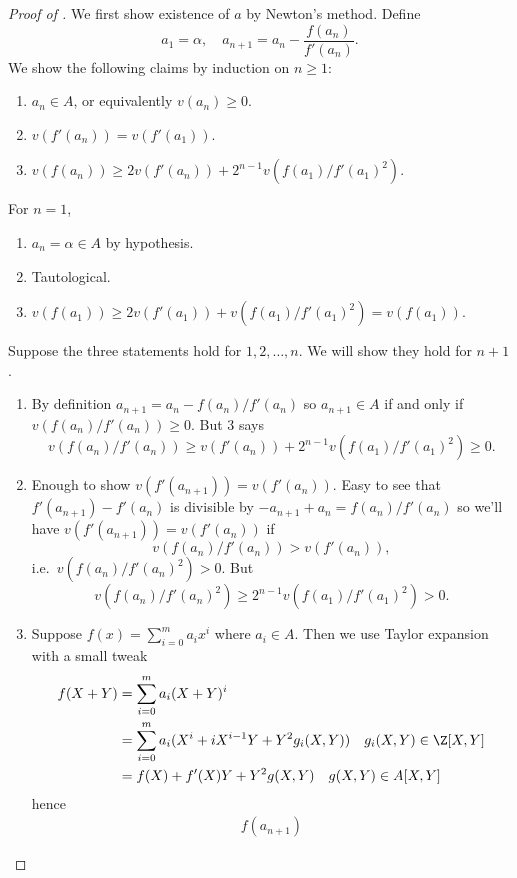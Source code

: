 \documentclass[a4paper]{article}
\begin{document}
\begin{proof}[Proof of ]
  We first show existence of \(a\) by Newton's method. Define
  \[
    a_1 = \alpha, \quad a_{n + 1} = a_n - \frac{f(a_n)}{f'(a_n)}.
  \]
  We show the following claims by induction on \(n \geq 1\):
  \begin{enumerate}
  \item \(a_n \in A\), or equivalently \(v(a_n) \geq 0\).
  \item \(v(f'(a_n)) = v(f'(a_1))\).
  \item \(v(f(a_n)) \geq 2v(f'(a_n)) + 2^{n - 1} v(f(a_1)/f'(a_1)^2)\).
  \end{enumerate}
  For \(n = 1\),
  \begin{enumerate}
  \item \(a_n = \alpha \in A\) by hypothesis.
  \item Tautological.
  \item \(v(f(a_1)) \geq 2v(f'(a_1)) + v(f(a_1)/f'(a_1)^2) = v(f(a_1))\).
  \end{enumerate}
  Suppose the three statements hold for \(1, 2, \dots, n\). We will show they hold for \(n + 1\).
  \begin{enumerate}
  \item By definition \(a_{n + 1} = a_n - f(a_n)/f'(a_n)\) so \(a_{n + 1} \in A\) if and only if \(v(f(a_n)/f'(a_n)) \geq 0\). But 3 says
    \[
      v(f(a_n)/f'(a_n)) \geq v(f'(a_n)) + 2^{n - 1} v(f(a_1)/f'(a_1)^2) \geq 0.
    \]
  \item Enough to show \(v(f'(a_{n + 1})) = v(f'(a_n))\). Easy to see that \(f'(a_{n + 1}) - f'(a_n)\) is divisible by \(-a_{n + 1} + a_n = f(a_n)/f'(a_n)\) so we'll have \(v(f'(a_{n + 1})) = v(f'(a_n))\) if
    \[
      v(f(a_n)/f'(a_n)) > v(f'(a_n)),
    \]
    i.e.\ \(v(f(a_n)/f'(a_n)^2) > 0\). But
    \[
      v(f(a_n)/f'(a_n)^2) \geq 2^{n - 1} v(f(a_1)/f'(a_1)^2) > 0.
    \]
  \item Suppose \(f(x) = \sum_{i = 0}^m a_i x^i\) where \(a_i \in A\). Then we use Taylor expansion with a small tweak
    \begin{align*}
      f(X + Y)
      &= \sum_{i = 0}^m a_i (X + Y)^i \\
      &= \sum_{i = 0}^m a_i (X^i + iX^{i - 1}Y + Y^2 g_i(X, Y)) \quad g_i(X, Y) \in \Z[X, Y] \\
      &= f(X) + f'(X) Y + Y^2 g(X, Y) \quad g(X, Y) \in A[X, Y]
    \end{align*}
    hence
    \begin{align*}
      f(a_{n + 1})

\end{align*}
\end{enumerate}
\end{proof}
\end{document}
